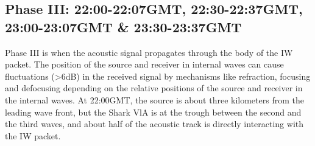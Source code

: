 \subsection{Phase III: 22:00-22:07GMT, 22:30-22:37GMT, 23:00-23:07GMT \& 23:30-23:37GMT}
Phase III is when the acoustic signal propagates through the body of the IW packet. The position of the source and receiver in internal waves can cause fluctuations (>6dB) in the received signal by mechanisms like refraction, focusing and defocusing depending on the relative positions of the source and receiver in the internal waves. At 22:00GMT,  the source is about three kilometers from the leading wave front, but the Shark VlA is at the trough between the second and the third waves, and about half of the acoustic track is directly interacting with the IW packet. 
%
